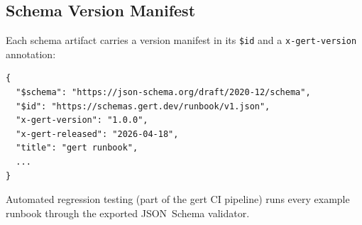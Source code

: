 \subsection{Schema Version Manifest}

Each schema artifact carries a version manifest in its \texttt{\$id} and a
\texttt{x-gert-version} annotation:

\begin{verbatim}
{
  "$schema": "https://json-schema.org/draft/2020-12/schema",
  "$id": "https://schemas.gert.dev/runbook/v1.json",
  "x-gert-version": "1.0.0",
  "x-gert-released": "2026-04-18",
  "title": "gert runbook",
  ...
}
\end{verbatim}

Automated regression testing (part of the gert CI pipeline) runs every
example runbook through the exported JSON~Schema validator.
